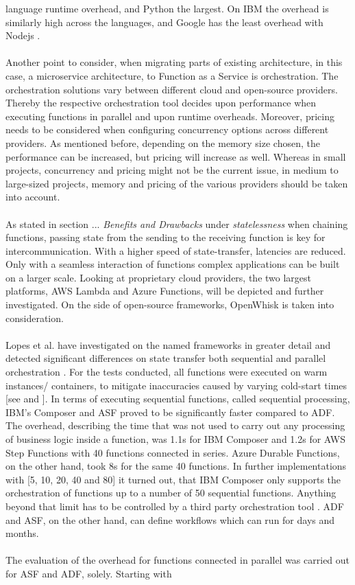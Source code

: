 \documentclass[11pt]{article}
\begin{document}
language runtime overhead, and Python the largest. On IBM the overhead is similarly high across the languages, and Google has the least overhead with Nodejs \cite{pawlik2019performance}.\\\\
 

Another point to consider, when migrating parts of existing architecture, in this case, a microservice architecture, to Function as a Service is orchestration. The orchestration solutions vary between different cloud and open-source providers. Thereby the respective orchestration tool decides upon performance when executing functions in parallel and upon runtime overheads. Moreover, pricing needs to be considered when configuring concurrency options across different providers. As mentioned before, depending on the memory size chosen, the performance can be increased, but pricing will increase as well. Whereas in small projects, concurrency and pricing might not be the current issue, in medium to large-sized projects, memory and pricing of the various providers should be taken into account.\\\\ As stated in section ... \textit{Benefits and Drawbacks} under \textit{statelessness} when chaining functions, passing state from the sending to the receiving function is key for intercommunication. With a higher speed of state-transfer, latencies are reduced. Only with a seamless interaction of functions complex applications can be built on a larger scale. Looking at proprietary cloud providers, the two largest platforms, AWS Lambda and Azure Functions,  will be depicted and further investigated. On the side of open-source frameworks, OpenWhisk is taken into consideration.\\\\ Lopes et al. have investigated on the named frameworks in greater detail and detected significant differences on state transfer both sequential and parallel orchestration \cite{lopez2018comparison}. For the tests conducted, all functions were executed on warm instances/ containers, to mitigate inaccuracies caused by varying cold-start times [see \cite{manner2018cold} and \cite{jackson2018investigation}]. In terms of executing sequential functions, called sequential processing, IBM's Composer and ASF proved to be significantly faster compared to ADF. The overhead, describing the time that was not used to carry out any processing of business logic inside a function, was 1.1s for IBM Composer and 1.2s for AWS Step Functions with 40 functions connected in series. Azure Durable Functions, on the other hand, took 8s for the same 40 functions. In further implementations with [5, 10, 20, 40 and 80] it turned out, that IBM Composer only supports the orchestration of functions up to a number of 50 sequential functions. Anything beyond that limit has to be controlled by a third party orchestration tool \cite{lopez2018comparison}. ADF and ASF, on the other hand, can define workflows which can run for days and months.\\\\ The evaluation of the overhead for functions connected in parallel was carried out for ASF and ADF, solely. Starting with 
\end{document}
